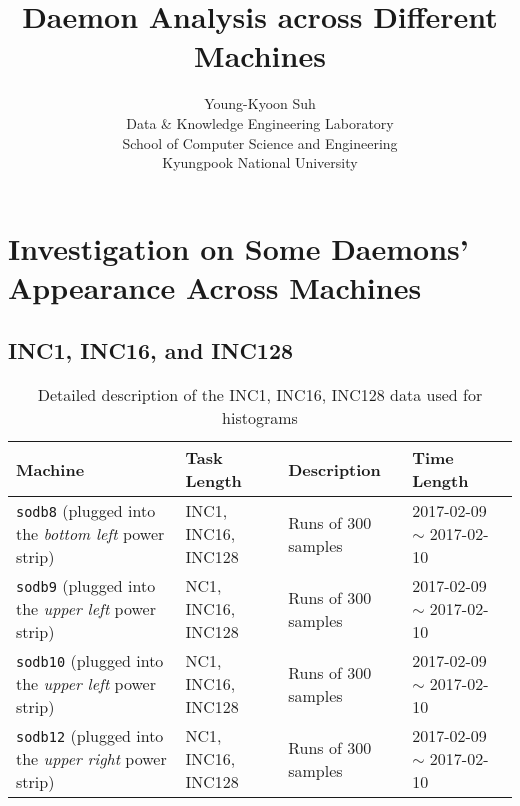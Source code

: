 \documentclass[10pt]{article}
\begin{document}
\title{Daemon Analysis across Different Machines}

\author{
Young-Kyoon Suh\\
Data \& Knowledge Engineering Laboratory\\
School of Computer Science and Engineering\\
Kyungpook National University\\
}
\maketitle

\section{Investigation on Some Daemons' Appearance Across Machines} 

\subsection{INC1, INC16, and INC128} 

\begin{table}[h]
\begin{center}
\begin{tabular}{|p{4cm}|p{3cm}|p{4cm}|p{4cm}|} \hline
Machine & Task Length & Description & Time Length\\ \hline
{\tt sodb8} (plugged into the {\em bottom left} power strip) & INC1, INC16, INC128 & Runs of 300 samples & 2017-02-09 $\sim$ 2017-02-10\\ \hline
{\tt sodb9}  (plugged into the {\em upper left} power strip)  & NC1, INC16, INC128 & Runs of 300 samples & 2017-02-09 $\sim$ 2017-02-10\\ \hline
{\tt sodb10}  (plugged into the {\em upper left} power strip)  & NC1, INC16, INC128 & Runs of 300 samples & 2017-02-09 $\sim$ 2017-02-10\\ \hline
{\tt sodb12}  (plugged into the {\em upper right} power strip)  & NC1, INC16, INC128 & Runs of 300 samples & 2017-02-09 $\sim$ 2017-02-10\\ \hline
\end{tabular}
\end{center}
\vspace{-.2in}
\caption{Detailed description of the INC1, INC16, INC128 data used for histograms\label{tab:exp_notesINCs}}
\end{table}
\end{document}
